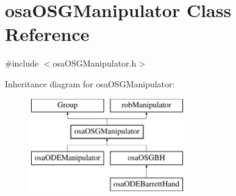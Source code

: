 \hypertarget{classosa_o_s_g_manipulator}{}\section{osa\+O\+S\+G\+Manipulator Class Reference}
\label{classosa_o_s_g_manipulator}


{\ttfamily \#include $<$osa\+O\+S\+G\+Manipulator.\+h$>$}

Inheritance diagram for osa\+O\+S\+G\+Manipulator\+:\begin{figure}[H]
\begin{center}
\leavevmode
\includegraphics[height=4.000000cm]{d3/d78/classosa_o_s_g_manipulator}
\end{center}
\end{figure}
